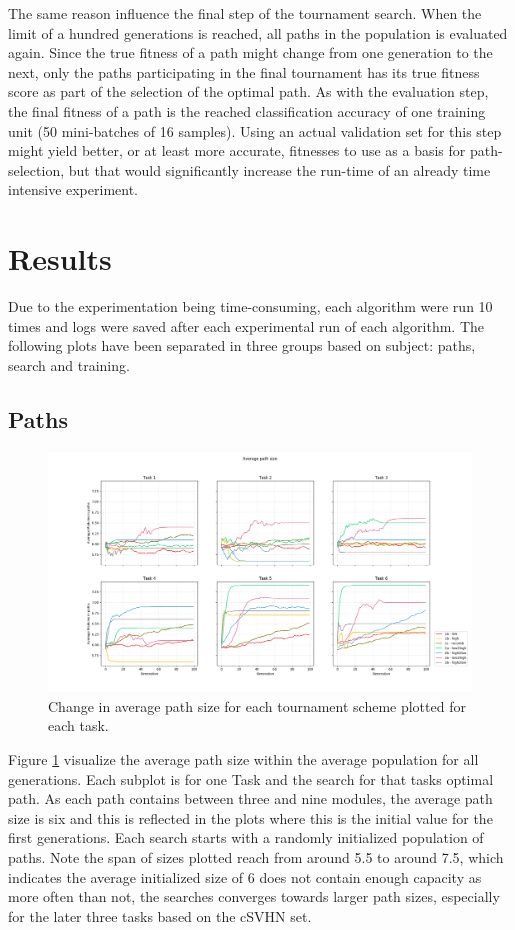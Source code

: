 The same reason influence the final step of the tournament search. When the limit of a hundred generations is reached, all paths in the population is evaluated again. Since the true fitness of a path might change from one generation to the next, only the paths participating in the final tournament has its true fitness score as part of the selection of the optimal path. As with the evaluation step, the final fitness of a path is the reached classification accuracy of one training unit (50 mini-batches of 16 samples). Using an actual validation set for this step might yield better, or at least more accurate, fitnesses to use as a basis for path-selection, but that would significantly increase the run-time of an already time intensive experiment. 

\section{Results}\label{Search-results}
Due to the experimentation being time-consuming, each algorithm were run 10 times and logs were saved after each experimental run of each algorithm. The following plots have been separated in three groups based on subject: paths, search and training. 

\subsection{Paths}
\begin{figure}[p!]%
    \includegraphics[width=\textwidth]{Chapters/Experiments/search_algo/figures/Average_path_size.png}
    \caption{Change in average path size for each tournament scheme plotted for each task.}
    \label{fig:search.avg_path_size}
\end{figure}

Figure \ref{fig:search.avg_path_size} visualize the average path size within the average population for all generations. Each subplot is for one Task and the search for that tasks optimal path. As each path contains between three and nine modules, the average path size is six and this is reflected in the plots where this is the initial value for the first generations. Each search starts with a randomly initialized population of paths. Note the span of sizes plotted reach from around 5.5 to around 7.5, which indicates the average initialized size of 6 does not contain enough capacity as more often than not, the searches converges towards larger path sizes, especially for the later three tasks based on the cSVHN set. 

